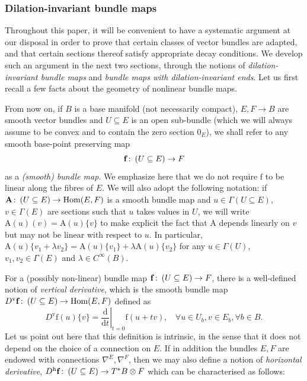 \documentclass{article}
\numberwithin{equation}{section}        %
\theoremstyle{bfnote}
\theoremstyle{definition}
\theoremstyle{bfremark}
\newcommand{\col}{\colon \thinspace}        %
\newcommand{\diff}{\mathrm{d}}                      %
\newcommand{\bmap}[1]{\boldsymbol{\mathrm{#1}}}     %
\DeclareMathOperator{\Hom}{Hom}                 %
\begin{document}
    \subsubsection{Dilation-invariant bundle maps}      \label{subsubsec: Dilation-invariant bundle maps}

Throughout this paper, it will be convenient to have a systematic argument at our disposal in order to prove that certain classes of vector bundles are adapted, and that certain sections thereof satisfy appropriate decay conditions. We develop such an argument in the next two sections, through the notions of \emph{dilation-invariant bundle maps} and \emph{bundle maps with dilation-invariant ends}. Let us first recall a few facts about the geometry of nonlinear bundle maps.

From now on, if $B$ is a base manifold (not necessarily compact), $E,F \to B$ are smooth vector bundles and $U \subseteq E$ is an open sub-bundle (which we will always assume to be convex and to contain the zero section $0_E$), we shall refer to any smooth base-point preserving map 
\begin{equation*}
    \bmap{f} \col (U \subseteq E) \to F
\end{equation*} 
as a \emph{(smooth) bundle map}. We emphasize here that we do not require $\bmap{f}$ to be linear along the fibres of $E$. We will also adopt the following notation: if $\bmap{A} \col (U \subseteq E) \to \Hom(E,F)$ is a smooth bundle map and $u \in \Gamma(U \subseteq E)$,  $v \in \Gamma(E)$ are sections such that $u$ takes values in $U$, we will write $\bmap{A}(u)(v) = \bmap{A}(u) \{ v\}$ to make explicit the fact that $\bmap{A}$ depends linearly on $v$ but may not be linear with respect to $u$. In particular, $\bmap{A}(u)\{v_1+ \lambda v_2\} = \bmap{A}(u)\{v_1\} + \lambda \bmap{A}(u) \{v_2\}$ for any $u \in \Gamma(U)$, $v_1,v_2 \in \Gamma(E)$ and $\lambda \in C^\infty(B)$. 

For a (possibly non-linear) bundle map $\bmap{f} \col (U \subseteq E) \to F$, there is a well-defined notion of \emph{vertical derivative}, which is the smooth bundle map $D^{\mathrm{v}} \bmap{f} \col (U \subseteq E) \to \Hom(E,F)$ defined as
\begin{equation}
    D^{\mathrm{v}} \bmap{f}(u)\{v\} = \left. \frac{\diff}{\diff t} \right|_{t=0} \bmap{f}(u+tv), ~~~~ \forall u \in U_b, v \in E_b, \forall b \in B.
\end{equation}
Let us point out here that this definition is intrinsic, in the sense that it does not depend on the choice of a connection on $E$. If in addition the bundles $E, F$ are endowed with connections $\nabla^E, \nabla^F$, then we may also define a notion of \emph{horizontal derivative}, $D^{\mathrm{h}} \bmap{f} \col (U \subseteq E) \to T^*B \otimes F$ which can be characterised as follows:
\end{document}
